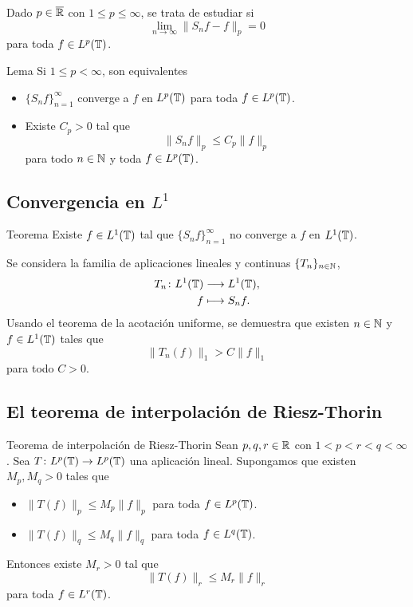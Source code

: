 \documentclass{beamer}
\begin{document}
\begin{frame}
    \begin{block}{}
        Dado $p \in \overline{\mathbb R}$ con $1\leq p \leq\infty$, se trata de estudiar si
        \[\lim_{n\to\infty}\|S_nf-f\|_p = 0\]
        para toda $f \in L^p(\mathbb T)$.
    \end{block}
    \pause
    \begin{block}{Lema}
        Si $1\leq p <\infty$, son equivalentes
        \begin{itemize}
            \item $\{S_nf\}_{n=1}^\infty$ converge a $f$ en $L^p(\mathbb T)$ para toda $f \in L^p(\mathbb T)$.
            \item Existe $C_p > 0$ tal que
            \[\|S_nf\|_p \leq C_p\|f\|_p\]
            para todo $n\in\mathbb N$ y toda $f \in L^p(\mathbb T)$.
        \end{itemize}
    \end{block}
\end{frame}

\subsection{Convergencia en \texorpdfstring{$L^1$}{L1}}

\begin{frame}
    \begin{block}{Teorema}
        Existe $f \in L^1(\mathbb T)$ tal que $\{S_nf\}_{n=1}^\infty$ no converge a $f$ en $L^1(\mathbb T)$.
    \end{block}
    \pause
    Se considera la familia de aplicaciones lineales y continuas $\{T_n\}_{n\in\mathbb N}$, 
    \begin{align*}
        T_n \colon L^1(\mathbb T) &\longrightarrow L^1(\mathbb T), \\
        f &\longmapsto S_nf.
    \end{align*}
    Usando el teorema de la acotación uniforme, se demuestra que existen $n\in\mathbb N$ y $f \in L^1(\mathbb T)$ tales que
    \[\|T_n(f)\|_1 > C\|f\|_1\]
    para todo $C>0$.
\end{frame}

\subsection{El teorema de interpolación de Riesz-Thorin}

\begin{frame}
    \begin{block}{Teorema de interpolación de Riesz-Thorin}
        Sean $p,q,r\in{\mathbb R}$ con $1 < p < r < q < \infty$. Sea $T \colon L^{p}(\mathbb T) \to L^{p}(\mathbb T)$ una aplicación lineal. Supongamos que existen $M_p,M_q>0$ tales que
        \begin{itemize}
            \item $\|T(f)\|_{p} \leq M_p\|f\|_{p}$ para toda $f \in L^{p}(\mathbb T)$.
            \item $\|T(f)\|_{q} \leq M_q\|f\|_{q}$ para toda $f \in L^{q}(\mathbb T)$.
        \end{itemize}
        Entonces existe $M_r>0$ tal que
        \[\|T(f)\|_r \leq M_r\|f\|_r\]
        para toda $f \in L^r(\mathbb T)$.
    \end{block}
\end{frame}
\end{document}

